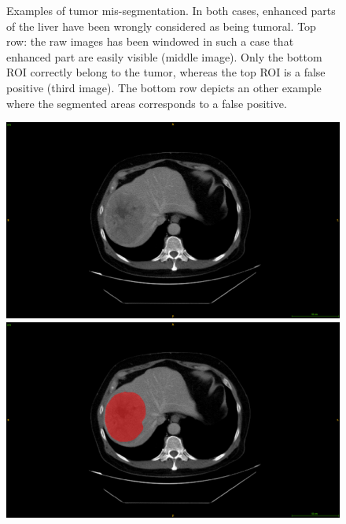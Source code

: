 {\begin{figure}[!ht]
\begin{mdframed}[backgroundcolor=blue!50,linecolor=blue!50]
\begin{minipage}{0.45\linewidth}
		\end{minipage}
	\end{mdframed}
	\caption{Examples of tumor mis-segmentation.
	In both cases, enhanced parts of the liver have been wrongly considered as being tumoral. Top row: the raw images has been windowed in such a case that enhanced part are easily visible (middle image). Only the bottom ROI correctly belong to the tumor, whereas the top ROI is a false positive (third image). The bottom row depicts an other example where the segmented areas corresponds to a false positive.}
	\label{fig:GDB_TumorMisSeg}
\end{figure}
}



\begin{figure}
	\begin{minipage}{0.3\linewidth}
		\includegraphics[width=\linewidth]{../HistologicalGradePrediction/images/image13.png}
	\end{minipage} \hspace{0.1cm}
	\begin{minipage}{0.3\linewidth}
		\includegraphics[width=\linewidth]{../HistologicalGradePrediction/images/image10.png}

\end{minipage}
\end{figure}
